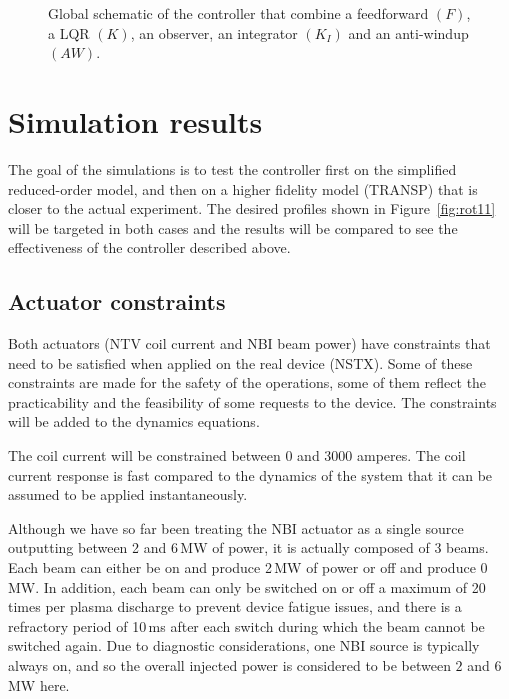 \documentclass{iopart}
\begin{document}
\begin{figure}

\caption{Global schematic of the controller that combine a feedforward $(F)$, a LQR $(K)$, an observer, an integrator $(K_I)$ and an anti-windup $(AW)$.}
\label{fig:model1}
\end{figure}



\section{Simulation results} 
\label{sec:sim_results}
The goal of the simulations is to test the controller first on the simplified reduced-order model, and then on a higher fidelity model (TRANSP) that is closer to the actual experiment.  The desired profiles shown in Figure~\ref{fig:rot11} will be targeted in both cases and the results will be compared to see the effectiveness of the controller described above.

\subsection{Actuator constraints}
\label{constraints}

Both actuators (NTV coil current and NBI beam power) have constraints that need to be satisfied when applied on the real device (NSTX). Some of these constraints are made for the safety of the operations, some of them reflect the practicability and the feasibility of some requests to the device. The constraints will be added to the dynamics equations.

The coil current will be constrained between 0 and 3000 amperes.
The coil current response is fast compared to the dynamics of the system that it can be assumed to be applied instantaneously.

Although we have so far been treating the NBI actuator as a single source outputting between 2 and 6\,MW of power, it is actually composed of 3 beams. Each beam can either be on and produce 2\,MW of power or off and produce 0\,MW.
In addition, each beam can only be switched on or off a maximum of 20 times per plasma discharge to prevent device fatigue issues, and there is a refractory period of 10\,ms after each switch during which the beam cannot be switched again.
Due to diagnostic considerations, one NBI source is typically always on, and so the overall injected power is considered to be between $2$ and $6$ MW here.
\end{document}
